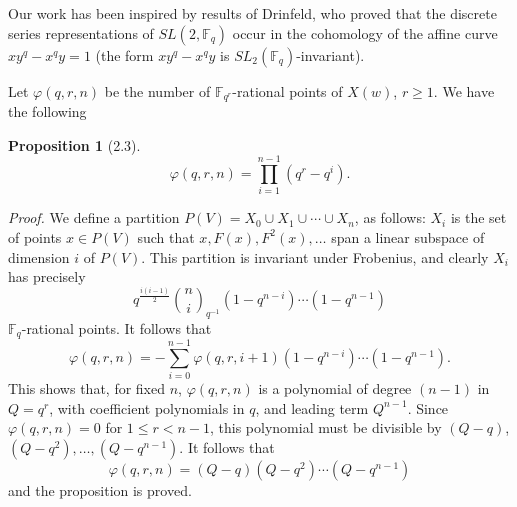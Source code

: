 \documentclass[11pt]{amsart}
\theoremstyle{plain}
\newtheorem{proposition}[theorem]{Proposition}
\theoremstyle{remark}
\begin{document}
Our work has been inspired by results of Drinfeld, who proved that the discrete series representations of $SL(2, \mathbb{F}_q)$ occur in the cohomology of the affine curve $xy^q - x^qy = 1$ (the form $xy^q - x^qy$ is $SL_2(\mathbb{F}_q)$-invariant).

Let $\varphi(q, r, n)$ be the number of $\mathbb{F}_{q^r}$-rational points of $X(w)$, $r \ge 1$. We have the following

\begin{proposition}[2.3]
\[
\varphi(q, r, n) = \prod_{i=1}^{n-1}(q^r - q^i).
\]
\end{proposition}

\textit{Proof.} We define a partition $P(V) = X_0 \cup X_1 \cup \cdots \cup X_n$, as follows: $X_i$ is the set of points $x \in P(V)$ such that $x, F(x), F^2(x), \dots$ span a linear subspace of dimension $i$ of $P(V)$. This partition is invariant under Frobenius, and clearly $X_i$ has precisely
\[
q^{\frac{i(i-1)}{2}}\binom{n}{i}_{q^{-1}}(1-q^{n-i})\cdots(1-q^{n-1})
\]
$\mathbb{F}_q$-rational points. It follows that
\[
\varphi(q, r, n) = -\sum_{i=0}^{n-1} \varphi(q, r, i+1)(1-q^{n-i})\cdots(1-q^{n-1}).
\]
This shows that, for fixed $n$, $\varphi(q, r, n)$ is a polynomial of degree $(n-1)$ in $Q = q^r$, with coefficient polynomials in $q$, and leading term $Q^{n-1}$. Since $\varphi(q, r, n) = 0$ for $1 \le r < n-1$, this polynomial must be divisible by $(Q-q)$, $(Q-q^2), \dots, (Q-q^{n-1})$. It follows that
\[
\varphi(q, r, n) = (Q-q)(Q-q^2)\cdots(Q-q^{n-1})
\]
and the proposition is proved.
\end{document}
